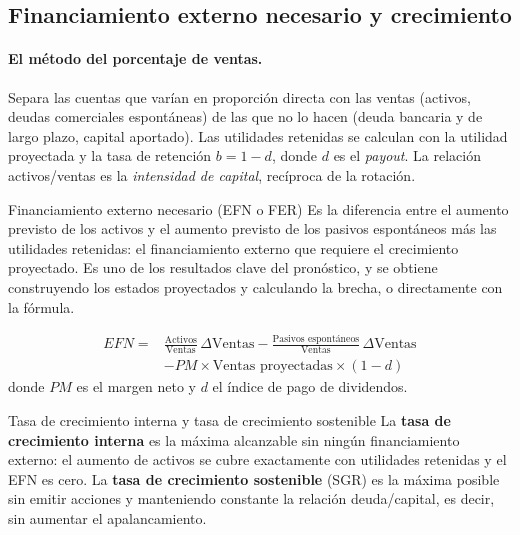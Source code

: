 \subsection{Financiamiento externo necesario y crecimiento}

\paragraph{El método del porcentaje de ventas.} Separa las cuentas que varían en proporción directa con las ventas (activos, deudas comerciales espontáneas) de las que no lo hacen (deuda bancaria y de largo plazo, capital aportado). Las utilidades retenidas se calculan con la utilidad proyectada y la tasa de retención $b = 1-d$, donde $d$ es el \emph{payout}. La relación activos/ventas es la \emph{intensidad de capital}, recíproca de la rotación.

\begin{definicion}{Financiamiento externo necesario (EFN o FER)}
Es la diferencia entre el aumento previsto de los activos y el aumento previsto de los pasivos espontáneos más las utilidades retenidas: el financiamiento externo que requiere el crecimiento proyectado. Es uno de los resultados clave del pronóstico, y se obtiene construyendo los estados proyectados y calculando la brecha, o directamente con la fórmula.
\end{definicion}

\begin{formulaBox}
\[
\begin{aligned}
EFN ={}& \frac{\text{Activos}}{\text{Ventas}}\,\Delta\text{Ventas}
- \frac{\text{Pasivos espontáneos}}{\text{Ventas}}\,\Delta\text{Ventas}\\
&- PM\times\text{Ventas proyectadas}\times(1-d)
\end{aligned}
\]
donde $PM$ es el margen neto y $d$ el índice de pago de dividendos.
\end{formulaBox}

\begin{definicion}{Tasa de crecimiento interna y tasa de crecimiento sostenible}
La \textbf{tasa de crecimiento interna} es la máxima alcanzable sin ningún financiamiento externo: el aumento de activos se cubre exactamente con utilidades retenidas y el EFN es cero. La \textbf{tasa de crecimiento sostenible} (SGR) es la máxima posible sin emitir acciones y manteniendo constante la relación deuda/capital, es decir, sin aumentar el apalancamiento.
\end{definicion}

